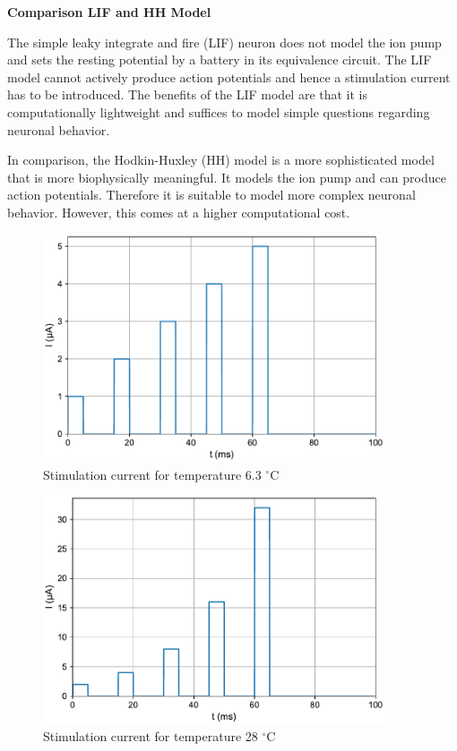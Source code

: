 \documentclass{scrartcl}
\begin{document}
\textbf{Comparison LIF and HH Model}

The simple leaky integrate and fire (LIF) neuron does not model the ion pump and sets the resting potential by a battery in its equivalence circuit. The LIF model cannot actively produce action potentials and hence a stimulation current has to be introduced. The benefits of the LIF model are that it is computationally lightweight and suffices to model simple questions regarding neuronal behavior. 

In comparison, the Hodkin-Huxley (HH) model is a more sophisticated model that is more biophysically meaningful. It models the ion pump and can produce action potentials. Therefore it is suitable to model more complex neuronal behavior. However, this comes at a higher computational cost.

\newpage
\begin{figure}[h]
	\centering
	\includegraphics[width=0.9\textwidth]{figures/inputcur_temp6.3.pdf}
	\caption{Stimulation current for temperature 6.3 $^{\circ}$C}
	\label{fig:inputcur_temp6_3}
\end{figure}
\begin{figure}[h!]
	\centering
	\includegraphics[width=0.9\textwidth]{figures/inputcur_temp28.pdf}
	\caption{Stimulation current for temperature 28 $^{\circ}$C}
	\label{fig:inputcur_temp28}
\end{figure}
\end{document}

